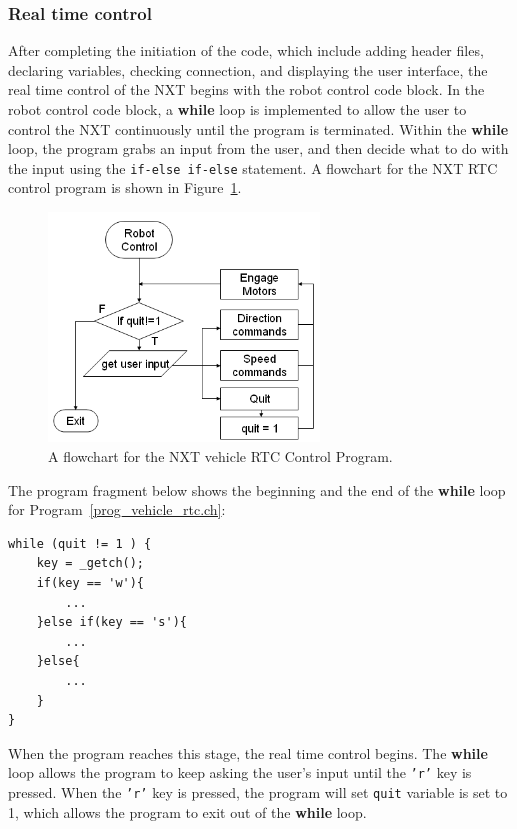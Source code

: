 \documentclass[11pt]{article}
\begin{document}
\subsubsection*{Real time control}
After completing the initiation of the code, which include adding header files, declaring variables,
checking connection, and displaying the user interface, the real time control of the NXT begins with 
the robot control code block. In the robot control code block, a {\bf while} loop is implemented to allow 
the user to control the NXT continuously until the program is terminated. Within the {\bf while} loop, the 
program grabs an input from the user, and then decide what to do with the input using the 
{\tt if-else if-else} statement. A flowchart for the NXT RTC control program is shown in 
Figure~\ref{fig_RTC_controlloop}.\\
\begin{figure}[h]
  \begin{center}
    \includegraphics[height=2.4in]{figure/mindstorm/RTC_controlloop.png}
    \caption{A flowchart for the NXT vehicle RTC Control Program.\label{fig_RTC_controlloop}}
  \end{center}
\end{figure}
The program fragment below shows the beginning and the end of the {\bf while} loop for 
Program~\ref{prog_vehicle_rtc.ch}:
\begin{lstlisting}
while (quit != 1 ) {
    key = _getch();
    if(key == 'w'){
        ...
    }else if(key == 's'){
        ...
    }else{
        ...
    }
}
\end{lstlisting}
When the program reaches this stage, the real time control begins. The {\bf while} 
loop allows the program to keep asking the user's input until the {\tt 'r'} key 
is pressed. When the {\tt 'r'} key is pressed, the program will set {\tt quit} 
variable is set to 1, which allows the program to exit out of the {\bf while} loop.\\
\end{document}
